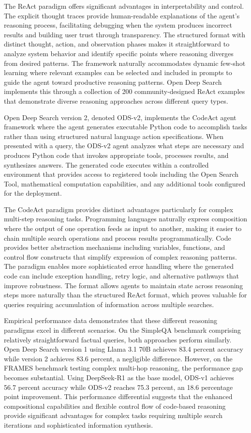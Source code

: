 The ReAct paradigm offers significant advantages in interpretability and control. The explicit thought traces provide human-readable explanations of the agent's reasoning process, facilitating debugging when the system produces incorrect results and building user trust through transparency. The structured format with distinct thought, action, and observation phases makes it straightforward to analyze system behavior and identify specific points where reasoning diverges from desired patterns. The framework naturally accommodates dynamic few-shot learning where relevant examples can be selected and included in prompts to guide the agent toward productive reasoning patterns. Open Deep Search implements this through a collection of 200 community-designed ReAct examples that demonstrate diverse reasoning approaches across different query types.

Open Deep Search version 2, denoted ODS-v2, implements the CodeAct agent framework where the agent generates executable Python code to accomplish tasks rather than using structured natural language action specifications. When presented with a query, the ODS-v2 agent analyzes what steps are necessary and produces Python code that invokes appropriate tools, processes results, and synthesizes answers. The generated code executes within a controlled environment that provides access to registered tools including the Open Search Tool, mathematical computation capabilities, and any additional tools configured for the deployment.

The CodeAct paradigm provides distinct advantages particularly for complex multi-step reasoning tasks. Programming languages naturally express composition where the output of one operation feeds as input to another, making it easier to chain multiple search operations and process results programmatically. Code provides better abstraction mechanisms including variables, functions, and control flow constructs that simplify expression of complex reasoning patterns. The paradigm enables more sophisticated error handling where the generated code can include exception handling, retry logic, and alternative pathways that improve robustness. The format allows agents to maintain state across reasoning steps more naturally than the structured ReAct format, which proves valuable for queries requiring accumulation of information across multiple searches.

Empirical performance data demonstrates that these different reasoning paradigms excel in different scenarios. On the SimpleQA benchmark comprising relatively straightforward factual queries, both approaches perform similarly. Open Deep Search version 1 using Llama 3.1 70B achieves 83.4 percent accuracy while version 2 achieves 83.6 percent, a negligible difference. However, on the FRAMES benchmark testing complex multi-hop reasoning, the performance gap becomes substantial. Using DeepSeek-R1 as the base model, ODS-v1 achieves 56.7 percent accuracy while ODS-v2 reaches 75.3 percent, an 18.6 percentage point improvement. This performance differential suggests that the enhanced compositional capabilities and flexible control flow of code-based reasoning provide significant advantages for complex tasks requiring multiple search iterations and sophisticated information synthesis.

